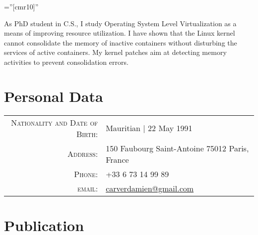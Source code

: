 \documentclass[a4paper,10pt]{article} %
\begin{document}
\pagestyle{empty} %

\font\fb=''[cmr10]'' %


\par{\bigskip\par}
\par{\footnotesize As PhD student in C.S., I study Operating System Level Virtualization as a means of improving resource utilization. I have shown that the Linux kernel cannot consolidate the memory of inactive containers without disturbing the services of active containers. My kernel patches aim at detecting memory activities to prevent consolidation errors. \par}

\section{Personal Data}

\begin{tabular}{rl}
	\textsc{Nationality and Date of Birth:} & Mauritian  | 22 May 1991 \\
	\textsc{Address:} & 150 Faubourg Saint-Antoine 75012 Paris, France\\
	\textsc{Phone:} & +33 6 73 14 99 89\\
	\textsc{email:} & \href{carverdamien@gmail.com}{carverdamien@gmail.com}
\end{tabular}


\section{Publication}
\end{document}
